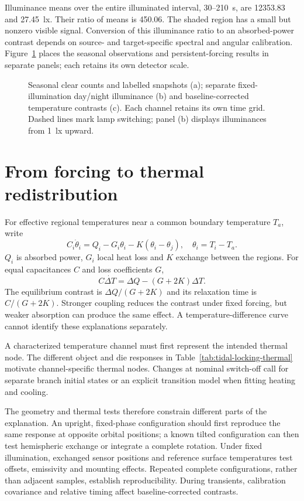 Illuminance means over the entire illuminated interval, 30--210~s, are 12353.83 and 27.45~lx. Their ratio of means is 450.06. The shaded region has a small but nonzero visible signal. Conversion of this illuminance ratio to an absorbed-power contrast depends on source- and target-specific spectral and angular calibration. Figure~\ref{fig:tidal-locking-data} places the seasonal observations and persistent-forcing results in separate panels; each retains its own detector scale.

\begin{figure}[t]
\centering

\caption{Seasonal clear counts and labelled snapshots (a); separate fixed-illumination day/night illuminance (b) and baseline-corrected temperature contrasts (c). Each channel retains its own time grid. Dashed lines mark lamp switching; panel (b) displays illuminances from 1~lx upward.}
\label{fig:tidal-locking-data}
\end{figure}

\section{From forcing to thermal redistribution}
For effective regional temperatures near a common boundary temperature $T_a$, write
\begin{equation}
 C_i\dot\theta_i=Q_i-G_i\theta_i-K(\theta_i-\theta_j),
 \quad\theta_i=T_i-T_a.
 \label{eq:tidal-locking-balance}
\end{equation}
$Q_i$ is absorbed power, $G_i$ local heat loss and $K$ exchange between the regions. For equal capacitances $C$ and loss coefficients $G$,
\begin{equation}
 C\dot{\Delta T}=\Delta Q-(G+2K)\Delta T.
 \label{eq:tidal-locking-difference}
\end{equation}
The equilibrium contrast is $\Delta Q/(G+2K)$ and its relaxation time is $C/(G+2K)$. Stronger coupling reduces the contrast under fixed forcing, but weaker absorption can produce the same effect. A temperature-difference curve cannot identify these explanations separately.

A characterized temperature channel must first represent the intended thermal node. The different object and die responses in Table~\ref{tab:tidal-locking-thermal} motivate channel-specific thermal nodes. Changes at nominal switch-off call for separate branch initial states or an explicit transition model when fitting heating and cooling.

The geometry and thermal tests therefore constrain different parts of the explanation. An upright, fixed-phase configuration should first reproduce the same response at opposite orbital positions; a known tilted configuration can then test hemispheric exchange or integrate a complete rotation. Under fixed illumination, exchanged sensor positions and reference surface temperatures test offsets, emissivity and mounting effects. Repeated complete configurations, rather than adjacent samples, establish reproducibility. During transients, calibration covariance and relative timing affect baseline-corrected contrasts.

